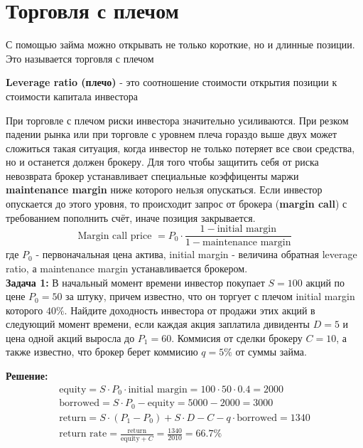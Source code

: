 \documentclass{article}
\begin{document}
\section{Торговля с плечом}

С помощью займа можно открывать не только короткие, но и длинные позиции. Это называется торговля с плечом

\textbf{Leverage ratio (плечо)} - это соотношение стоимости открытия позиции к стоимости капитала инвестора
 
 При торговле с плечом риски инвестора значительно усиливаются. При резком падении рынка или при торговле с уровнем плеча гораздо выше двух может сложиться такая ситуация, когда инвестор не только потеряет все свои средства, но и останется должен брокеру. Для того чтобы защитить себя от риска невозврата брокер устанавливает специальные коэффиценты маржи \textbf{maintenance margin} ниже которого нельзя опускаться. Если инвестор опускается до этого уровня, то происходит запрос от брокера (\textbf{margin call}) с требованием пополнить счёт, иначе позиция закрывается.
\begin{equation}\label{margin call}
    \text{Margin call price }=P_0\cdot\frac{1-\text{initial margin}}{1-\text{maintenance margin}}
\end{equation}
где $P_0$ - первоначальная цена актива, initial margin - величина обратная leverage ratio, а maintenance margin устанавливается брокером.
 \\
 
 \textbf{Задача 1:}
 В начальный момент времени инвестор покупает $S=100$ акций по цене $P_0=50$ за штуку, причем известно, что он торгует с плечом initial margin которого $40\%$. Найдите доходность инвестора от продажи этих акций в следующий момент времени, если каждая акция заплатила дивиденты $D=5$ и цена одной акций выросла до $P_1=60$. Коммисия от сделки брокеру  $C=10$, а также известно, что брокер берет коммисию $q=5\%$ от суммы займа.  
 
 \textbf{Решение:}
\begin{align*}
    &\text{equity}=S\cdot P_0\cdot\text{initial margin}=100\cdot 50\cdot 0.4=2000&
    \\
    &\text{borrowed}=S\cdot P_0-\text{equity}=5000-2000=3000&
    \\
    &\text{return}=S\cdot(P_1-P_0)+S\cdot D-C-q\cdot\text{borrowed}=1340&
    \\
    &\text{return rate}=\frac{\text{return}}{\text{equity}+C}=\frac{1340}{2010}=66.7\%&
\end{align*}
\end{document}
